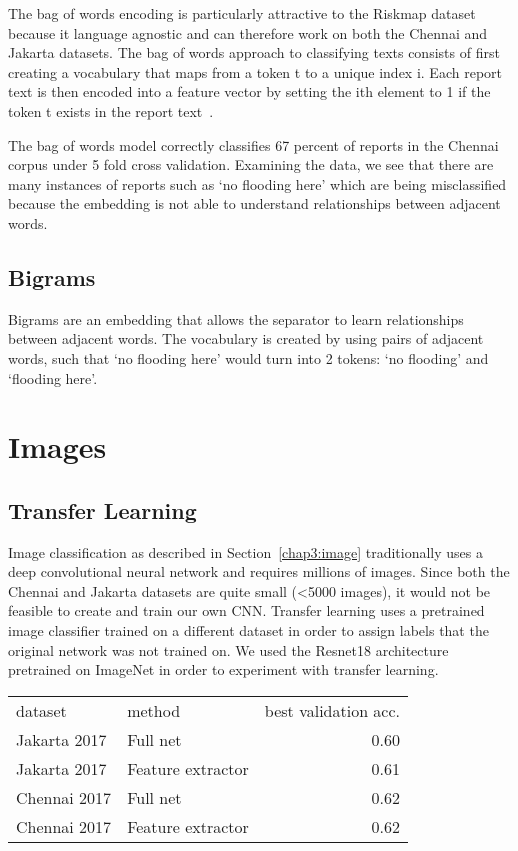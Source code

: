 The bag of words encoding is particularly attractive to the Riskmap
dataset because it language agnostic and can therefore work on both the Chennai
and Jakarta datasets.  The bag of words approach to classifying texts consists
of first creating a vocabulary that maps from a token t to a unique index i. Each
report text is then encoded into a feature vector by setting the ith element to
1 if the token t exists in the report
text~\cite{khuranaNaturalLanguageProcessing2017}.

The bag of words model correctly classifies 67 percent of reports in the Chennai corpus
under 5 fold cross validation. Examining the data, we see that there are many
instances of reports such as `no flooding here' which are being
misclassified because the embedding is not able to understand relationships
between adjacent words.

\subsection{Bigrams}
Bigrams are an embedding that allows the separator to learn relationships
between adjacent words. The vocabulary is created by using pairs of adjacent
words, such that `no flooding here' would turn into 2 tokens: `no flooding' and
`flooding here'.


\section{Images}
\subsection{Transfer Learning}
Image classification as described in Section~\ref{chap3:image} traditionally uses a
deep convolutional neural network and requires millions of images. Since both the
Chennai and Jakarta datasets are quite small (<5000 images), it would not be
feasible to create and train our own CNN. Transfer learning uses a pretrained
image classifier trained on a different dataset in order to assign labels that the
original network was not trained on.
We used the Resnet18 architecture pretrained on ImageNet in order to
experiment with transfer learning.

\begin{tabular}{llr}\label{table:transfer_learning}
\toprule
      dataset &             method &  best validation acc. \\
 Jakarta 2017 &           Full net &                  0.60 \\
\midrule
 Jakarta 2017 &  Feature extractor &                  0.61 \\
 Chennai 2017 &           Full net &                  0.62 \\
 Chennai 2017 &  Feature extractor &                  0.62 \\
\bottomrule
\end{tabular}

